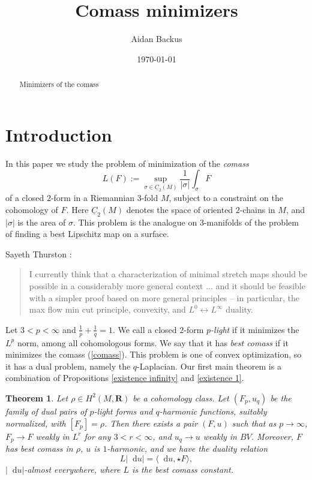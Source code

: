 \documentclass[reqno,11pt]{amsart}
\title{Comass minimizers}
\author{Aidan Backus}
\date{\today}
\newcommand{\RR}{\mathbf{R}}
\newcommand*\dif{\mathop{}\!\mathrm{d}}
\newcommand{\Chain}{\underline C}
\newcommand{\dfn}[1]{\emph{#1}\index{#1}}
\newtheorem{mainthm}{Theorem}
\theoremstyle{definition}
\numberwithin{equation}{section}
\begin{document}
\begin{abstract}
	Minimizers of the comass
\end{abstract}

\maketitle

\section{Introduction}
In this paper we study the problem of minimization of the \dfn{comass}
\begin{equation}\label{comass}
L(F) := \sup_{\sigma \in \Chain_2(M)} \frac{1}{|\sigma|} \int_\sigma F
\end{equation}
of a closed $2$-form in a Riemannian $3$-fold $M$, subject to a constraint on the cohomology of $F$.
Here $\Chain_2(M)$ denotes the space of oriented $2$-chains in $M$, and $|\sigma|$ is the area of $\sigma$.
This problem is the analogue on $3$-manifolds of the problem of finding a best Lipschitz map on a surface.

Sayeth Thurston \cite[Abstract]{Thurston98}:
\begin{quote}
I currently think that a characterization of minimal stretch maps should be possible in a considerably more general context ... and it should be feasible with a simpler proof based on more general principles -- in particular, the max flow min cut principle, convexity, and $L^0 \leftrightarrow L^\infty$ duality.
\end{quote}

Let $3 < p < \infty$ and $\frac{1}{p} + \frac{1}{q} = 1$.
We call a closed $2$-form \dfn{$p$-light} if it minimizes the $L^p$ norm, among all cohomologous forms.
We say that it has \dfn{best comass} if it minimizes the comass (\ref{comass}).
This problem is one of convex optimization, so it has a dual problem, namely the $q$-Laplacian.
Our first main theorem is a combination of Propositions \ref{existence infinity} and \ref{existence 1}.

\begin{mainthm}
Let $\rho \in H^2(M, \RR)$ be a cohomology class.
Let $(F_p, u_q)$ be the family of dual pairs of $p$-light forms and $q$-harmonic functions, suitably normalized, with $[F_p] = \rho$.
Then there exists a pair $(F, u)$ such that as $p \to \infty$, $F_p \to F$ weakly in $L^r$ for any $3 < r < \infty$, and $u_q \to u$ weakly in $BV$.
Moreover, $F$ has best comass in $\rho$, $u$ is $1$-harmonic, and we have the duality relation 
\begin{equation}\label{max flow mean cut}
L|\dif u| = \langle \dif u, \star F\rangle,
\end{equation}
$|\dif u|$-almost everywhere, where $L$ is the best comass constant.
\end{mainthm}
\end{document}
